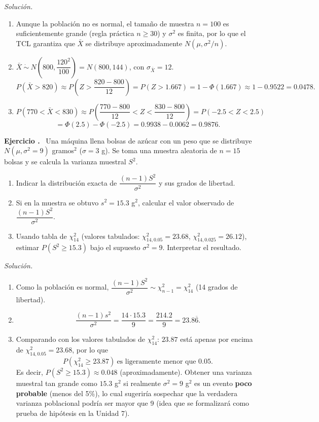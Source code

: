 \documentclass[11pt,a4paper]{article}
\newcounter{ejnum}
\newenvironment{ejercicio}{\refstepcounter{ejnum}\par\medskip\noindent\textbf{Ejercicio \theejnum.}~}{\par}
\newenvironment{solucion}{\par\noindent\textit{Solución.}~}{\par\vspace{1em}}
\begin{document}
\begin{solucion}
\begin{enumerate}[label=(\alph*)]
\item Aunque la población no es normal, el tamaño de muestra $n=100$ es suficientemente grande (regla práctica $n\geq 30$) y $\sigma^2$ es finita, por lo que el TCL garantiza que $\bar X$ se distribuye aproximadamente $N(\mu,\sigma^2/n)$.
\item $\bar X \ \dot\sim\ N\left(800,\dfrac{120^2}{100}\right) = N(800,144)$, con $\sigma_{\bar X}=12$.
$$P(\bar X>820) \approx P\left(Z>\frac{820-800}{12}\right) = P(Z>1.667) = 1-\Phi(1.667) \approx 1-0.9522 = 0.0478.$$
\item
$$P(770<\bar X<830) \approx P\left(\frac{770-800}{12}<Z<\frac{830-800}{12}\right) = P(-2.5<Z<2.5)$$
$$=\Phi(2.5)-\Phi(-2.5) = 0.9938-0.0062 = 0.9876.$$
\end{enumerate}
\end{solucion}

\begin{ejercicio}
Una máquina llena bolsas de azúcar con un peso que se distribuye $N(\mu, \sigma^2=9)$ gramos$^2$ ($\sigma=3$ g). Se toma una muestra aleatoria de $n=15$ bolsas y se calcula la varianza muestral $S^2$.
\begin{enumerate}[label=(\alph*)]
\item Indicar la distribución exacta de $\dfrac{(n-1)S^2}{\sigma^2}$ y sus grados de libertad.
\item Si en la muestra se obtuvo $s^2=15.3$ g$^2$, calcular el valor observado de $\dfrac{(n-1)S^2}{\sigma^2}$.
\item Usando tabla de $\chi^2_{14}$ (valores tabulados: $\chi^2_{14,0.05}=23.68$, $\chi^2_{14,0.025}=26.12$), estimar $P(S^2 \geq 15.3)$ bajo el supuesto $\sigma^2=9$. Interpretar el resultado.
\end{enumerate}
\end{ejercicio}

\begin{solucion}
\begin{enumerate}[label=(\alph*)]
\item Como la población es normal, $\dfrac{(n-1)S^2}{\sigma^2} \sim \chi^2_{n-1} = \chi^2_{14}$ (14 grados de libertad).
\item
$$\frac{(n-1)s^2}{\sigma^2} = \frac{14\cdot 15.3}{9} = \frac{214.2}{9} = 23.8\overline{6}.$$
\item Comparando con los valores tabulados de $\chi^2_{14}$: $23.87$ está apenas por encima de $\chi^2_{14,0.05}=23.68$, por lo que
$$P(\chi^2_{14}\geq 23.87) \ \text{es ligeramente menor que } 0.05.$$
Es decir, $P(S^2\geq 15.3) \approx 0.048$ (aproximadamente). Obtener una varianza muestral tan grande como $15.3$ g$^2$ si realmente $\sigma^2=9$ g$^2$ es un evento \textbf{poco probable} (menos del 5\%), lo cual sugeriría sospechar que la verdadera varianza poblacional podría ser mayor que 9 (idea que se formalizará como prueba de hipótesis en la Unidad 7).
\end{enumerate}
\end{solucion}
\end{document}
